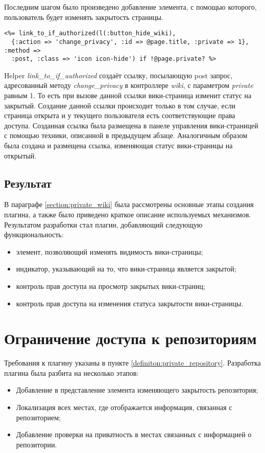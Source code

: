Последним шагом было произведено добавление элемента, с помощью которого,
пользователь будет изменять закрытость страницы.
\small{\begin{lstlisting}
<%= link_to_if_authorized(l(:button_hide_wiki),
  {:action => 'change_privacy', :id => @page.title, :private => 1}, :method =>
  :post, :class => 'icon icon-hide') if !@page.private? %>
\end{lstlisting}}
Helper \textit{link\_to\_if\_authorized} создаёт ссылку, посылающую post
запрос, адресованный методу \textit{change\_privacy} в контроллере
\textit{wiki}, с параметром \textit{private} равным 1. То есть при вызове
данной ссылки вики-страница изменит статус на закрытый. Создание данной ссылки
происходит только в том случае, если страница открыта и у текущего пользователя
есть соответствующие права доступа. Созданная ссылка была размещена в панеле
управления вики-страницей с помощью техники, описанной в предыдущем абзаце.
Аналогичным образом была создана и размещена ссылка, изменяющая статус
вики-страницы на открытый.

\subsection{Результат}
В параграфе \ref{section:private_wiki} была рассмотрены основные этапы создания
плагина, а также было приведено краткое описание используемых механизмов.
Результатом разработки стал плагин, добавляющий следующую функциональность:
\begin{itemize}
  \item элемент, позволяющий изменять видимость вики-страницы;
  \item индикатор, указывающий на то, что вики-страница является закрытой;
  \item контроль прав доступа на просмотр закрытых вики-страниц;
  \item контроль прав доступа на изменения статуса закрытости вики-страницы.
\end{itemize}

\section{Ограничение доступа к репозиториям}
Требования к плагину указаны в пункте \ref{definiton:private_repository}.
Разработка плагина была разбита на несколько этапов:
\begin{itemize}
  \item Добавление в представление элемента изменяющего закрытость репозитория;
  \item Локализация всех местах, где отображается информация, связанная с
  репозиторием;
  \item Добавление проверки на приватность в местах связанных с
  информацией о репозитории.
\end{itemize}


